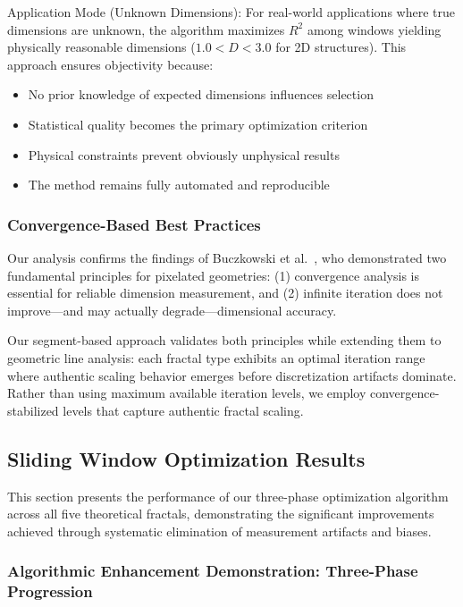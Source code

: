 \documentclass[preprint,12pt]{elsarticle}
\def\textbf#1{#1}%
\begin{document}
\textbf{Application Mode (Unknown Dimensions)}:
For real-world applications where true dimensions are unknown, the algorithm maximizes $R^2$ among windows yielding physically reasonable dimensions ($1.0 < D < 3.0$ for 2D structures). This approach ensures objectivity because:
\begin{itemize}
\item No prior knowledge of expected dimensions influences selection
\item Statistical quality becomes the primary optimization criterion
\item Physical constraints prevent obviously unphysical results
\item The method remains fully automated and reproducible
\end{itemize}

\subsubsection{Convergence-Based Best Practices}

Our analysis confirms the findings of Buczkowski et al.~\cite{buczkowski1998}, who demonstrated two fundamental principles for pixelated geometries: (1) convergence analysis is essential for reliable dimension measurement, and (2) infinite iteration does not improve—and may actually degrade—dimensional accuracy.

Our segment-based approach validates both principles while extending them to geometric line analysis: each fractal type exhibits an optimal iteration range where authentic scaling behavior emerges before discretization artifacts dominate. Rather than using maximum available iteration levels, we employ convergence-stabilized levels that capture authentic fractal scaling.

\subsection{Sliding Window Optimization Results}
\label{subsec:sliding_window_results}

This section presents the performance of our three-phase optimization algorithm across all five theoretical fractals, demonstrating the significant improvements achieved through systematic elimination of measurement artifacts and biases.

\subsubsection{Algorithmic Enhancement Demonstration: Three-Phase Progression}
\end{document}
